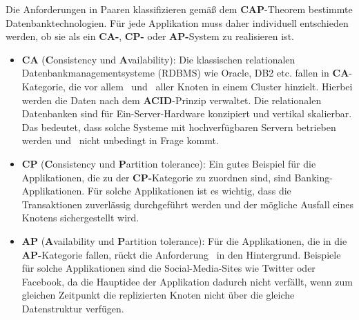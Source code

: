 Die Anforderungen in Paaren klassifizieren gemäß dem \textbf{CAP}-Theorem bestimmte Datenbanktechnologien. Für jede Applikation muss daher individuell entschieden werden, ob sie als ein \textbf{CA-}, \textbf{CP-} oder \textbf{AP-}System zu realisieren ist.
\begin{itemize}
\item \textbf{CA} (\textbf{C}onsistency und \textbf{A}vailability): Die klassischen relationalen Datenbankmanagementsysteme (RDBMS) wie Oracle, DB2 etc. fallen in \textbf{CA}-Kategorie, die vor allem \Cap\ und \cAp\ aller Knoten in einem Cluster hinzielt. Hierbei werden die Daten nach dem \textbf{ACID}-Prinzip verwaltet. Die relationalen Datenbanken sind für Ein-Server-Hardware konzipiert und vertikal skalierbar. Das bedeutet, dass solche Systeme mit hochverfügbaren Servern betrieben werden und \caP\  nicht unbedingt in Frage kommt.


\item \textbf{CP} (\textbf{C}onsistency und \textbf{P}artition tolerance): Ein gutes Beispiel für die Applikationen, die zu der \textbf{CP-}Kategorie zu zuordnen sind, sind Banking-Applikationen. Für solche Applikationen ist es wichtig, dass die Transaktionen zuverlässig durchgeführt werden und der mögliche Ausfall eines Knotens sichergestellt wird.
%

\item \textbf{AP} (\textbf{A}vailability und \textbf{P}artition tolerance): Für die Applikationen, die in die \textbf{AP-}Kategorie fallen, rückt die Anforderung \Cap\ in den Hintergrund. Beispiele für solche Applikationen sind die Social-Media-Sites wie Twitter oder Facebook, da die Hauptidee der Applikation dadurch nicht verfällt, wenn zum gleichen Zeitpunkt die replizierten Knoten nicht über die gleiche Datenstruktur verfügen. 
\end{itemize}
